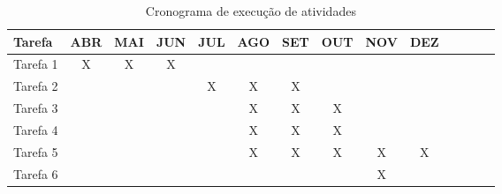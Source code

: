 \begin{table}[!htpb]
	\centering
	\caption{Cronograma de execução de atividades}
	\begin{center}
		\begin{tabular}{|l|c|c|c|c|c|c|c|c|c|c|c|c|c|} \hline
Tarefa&ABR&MAI&JUN&JUL&AGO&SET&OUT&NOV&DEZ\\
			\hline
			Tarefa 1 &X&X&X& & & & & & \\
			\hline
			Tarefa 2 & & & &X&X&X& & & \\
			\hline
			Tarefa 3 & & & & &X&X&X& & \\
			\hline
			Tarefa 4 & & & & &X&X&X& & \\
			\hline
			Tarefa 5 & & & &&X&X&X&X&X \\
			\hline
			Tarefa 6 & & & & & & & & X& \\
			\hline
		\end{tabular}
		\label{tab:cronograma}
	\end{center}
\end{table} 


\selectfont%